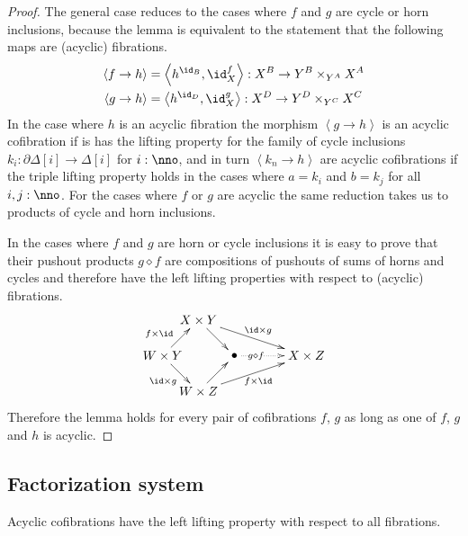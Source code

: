 \documentclass{tac}
\newcommand\of{:}
\newcommand\simplex\Delta
\newcommand\cycle{\partial\Delta}
\newcommand\tuplet[1]{\left\langle #1 \right\rangle}
\newcommand\pp{\mathbin\diamond}
\begin{document}
\begin{proof} The general case reduces to the cases where $f$ and $g$ are cycle or horn inclusions, because the lemma is equivalent to the statement that the following maps are (acyclic) fibrations. 
\begin{align*}
\tuplet{f\to h}&=\tuplet{h^{\id_B},\id_X^f}\of X^B \to Y^B\times_{Y^A} X^A\\
\tuplet{g\to h}&=\tuplet{h^{\id_D},\id_X^g}\of X^D \to Y^D\times_{Y^C} X^C
\end{align*}
In the case where $h$ is an acyclic fibration the morphism $\tuplet{g\to h}$ is an acyclic cofibration if is has the lifting property for the family of cycle inclusions $k_i\of \cycle[i]\to\simplex[i]$ for $i\of\nno$, and in turn $\tuplet{k_n\to h}$ are acyclic cofibrations if the triple lifting property holds in the cases where $a=k_i$ and $b=k_j$ for all $i,j\of\nno$. For the cases where $f$ or $g$ are acyclic the same reduction takes us to products of cycle and horn inclusions.

In the cases where $f$ and $g$ are horn or cycle inclusions it is easy to prove that their pushout products $g\pp f$ are compositions of pushouts of sums of horns and cycles and therefore have the left lifting properties with respect to (acyclic) fibrations. 
\[\xy
(0,10)*+{W\times Y}="left",(20,10)*+{\bullet}="middle",(10,20)*+{X\times Y}="top",(10,0)*+{W\times Z}="bottom",(40,10)*+{X\times Z}="right"
\ar^(.4){f\times \id} "left";"top" \ar_{\id\times g} "left";"bottom" \ar "top";"middle" \ar "bottom";"middle"
\ar@{.>}|(.3){g\pp f} "middle";"right" \ar^{\id\times g} "top";"right" \ar_{f\times\id} "bottom";"right"
\endxy\]
Therefore the lemma holds for every pair of cofibrations $f$, $g$ as long as one of $f$, $g$ and $h$ is acyclic.
\end{proof}

\subsection{Factorization system}
\begin{lemma} Acyclic cofibrations have the left lifting property with respect to all fibrations. \label{acyclic have lifting}\end{lemma}
\end{document}
